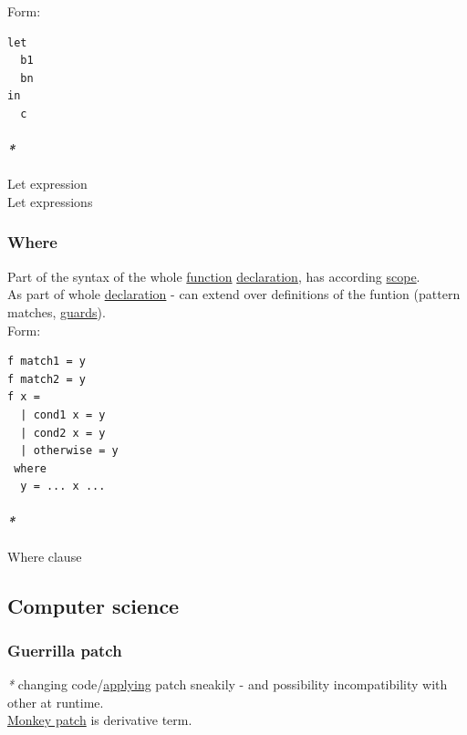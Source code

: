 \documentclass[11pt]{article}
\begin{document}
Form:\\
\begin{verbatim}
let
  b1
  bn
in
  c
\end{verbatim}

\paragraph{\emph{*}}
\label{sec:org513160e}

\label{orgbdeade5}Let expression\\
\label{orgb2920e8}Let expressions\\

\subsubsection{\label{orgefd1ecd}Where}
\label{sec:orgcf1f67b}
Part of the syntax of the whole \hyperref[orgeb5cddb]{function} \hyperref[org56ef1b9]{declaration}, has according \hyperref[orga4eed83]{scope}.\\

As part of whole \hyperref[org56ef1b9]{declaration} - can extend over definitions of the funtion (pattern matches, \hyperref[orge8adc07]{guards}).\\

Form:\\
\begin{verbatim}
f match1 = y
f match2 = y
f x =
  | cond1 x = y
  | cond2 x = y
  | otherwise = y
 where
  y = ... x ...
\end{verbatim}

\paragraph{\emph{*}}
\label{sec:org06b4781}

\label{org6b6b81c}Where clause\\

\subsection{Computer science}
\label{sec:org4cbaddf}
\subsubsection{\label{org2a865ef}Guerrilla patch}
\label{sec:orgef7e69c}
\emph{*} changing code/\hyperref[orgc54ef49]{applying} patch sneakily - and possibility incompatibility with other at runtime.\\
\hyperref[org382198a]{Monkey patch} is derivative term.\\
\end{document}
